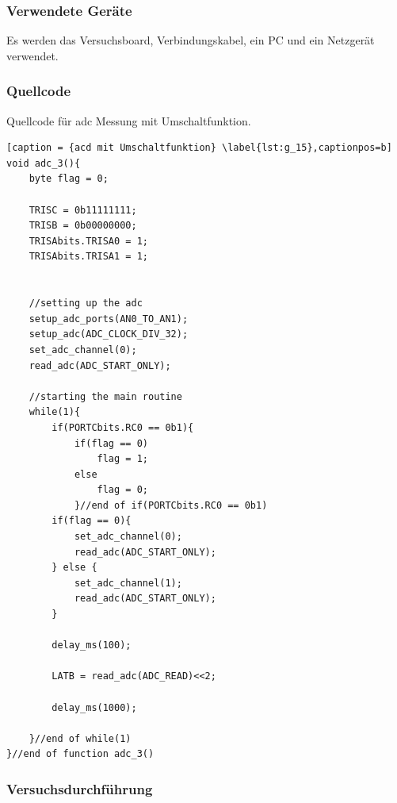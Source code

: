 \documentclass[12pt,a4paper]{article}
\begin{document}
\subsubsection*{Verwendete Geräte}

Es werden das Versuchsboard, Verbindungskabel, ein PC und ein Netzgerät verwendet.

\subsubsection*{Quellcode}

Quellcode für adc Messung mit Umschaltfunktion.

\lstset{language=C, basicstyle=\tiny}
\begin{lstlisting}[caption = {acd mit Umschaltfunktion} \label{lst:g_15},captionpos=b]
void adc_3(){
	byte flag = 0;

	TRISC = 0b11111111;
	TRISB = 0b00000000;
	TRISAbits.TRISA0 = 1;
	TRISAbits.TRISA1 = 1;
	
	
	//setting up the adc
	setup_adc_ports(AN0_TO_AN1);
	setup_adc(ADC_CLOCK_DIV_32);
	set_adc_channel(0);
	read_adc(ADC_START_ONLY);
	
	//starting the main routine
	while(1){
		if(PORTCbits.RC0 == 0b1){
			if(flag == 0)
				flag = 1;
			else
				flag = 0;
			}//end of if(PORTCbits.RC0 == 0b1)
		if(flag == 0){
			set_adc_channel(0);
			read_adc(ADC_START_ONLY);
		} else {
			set_adc_channel(1);
			read_adc(ADC_START_ONLY);			
		}
		
		delay_ms(100);
		
		LATB = read_adc(ADC_READ)<<2;
		
		delay_ms(1000);
				
	}//end of while(1)
}//end of function adc_3()
\end{lstlisting}

\subsubsection*{Versuchsdurchführung}
\end{document}
